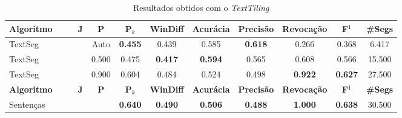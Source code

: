 \documentclass{article}
\begin{document}
\begin{table}[!h]
\begin{tabular}{|l||c|c|c|c|c|c|c|c|c|c|c|}
\hline
		\textbf{Algoritmo} &&& 
		\textbf{J} &
		\textbf{P} & 
		\textbf{P$_k$} & 
		\textbf{WinDiff} & 
		\textbf{Acurácia} & 
		\textbf{Precisão} & 
		\textbf{Revocação} &
		\textbf{F$^1$} &
		\textbf{\#Segs} \\	\hline




TextSeg &&&& Auto & \cellcolor{gray!20} \textbf{0.455} & 0.439 & 0.585 & \cellcolor{gray!20} \textbf{0.618} & 0.266 & 0.368 & 6.417  \\ \hline 

 TextSeg &&&& 0.500 & 0.475 & \cellcolor{gray!20} \textbf{0.417} & \cellcolor{gray!20} \textbf{0.594} & 0.565 & 0.608 & 0.566 & 15.500  \\ \hline 

 TextSeg &&&& 0.900 & 0.604 & 0.484 & 0.524 & 0.498 & \cellcolor{gray!20} \textbf{0.922} & \cellcolor{gray!20} \textbf{0.627} & 27.500  \\ \hline 

\hline
		\textbf{Algoritmo} &&& 
		\textbf{J} &
		\textbf{P} & 
		\textbf{P$_k$} & 
		\textbf{WinDiff} & 
		\textbf{Acurácia} & 
		\textbf{Precisão} & 
		\textbf{Revocação} &
		\textbf{F$^1$} &
		\textbf{\#Segs} \\	\hline


Sentenças &&&&& \cellcolor{gray!20} \textbf{0.640} & \cellcolor{gray!20} \textbf{0.490} & \cellcolor{gray!20} \textbf{0.506} & \cellcolor{gray!20} \textbf{0.488} & \cellcolor{gray!20} \textbf{1.000} & \cellcolor{gray!20} \textbf{0.638} & 30.500  \\ \hline 



	\end{tabular}
	\caption{Resultados obtidos com o \textit{TextTiling}}
	\label{tab:resultadosTT}
\end{table}
\end{document}
